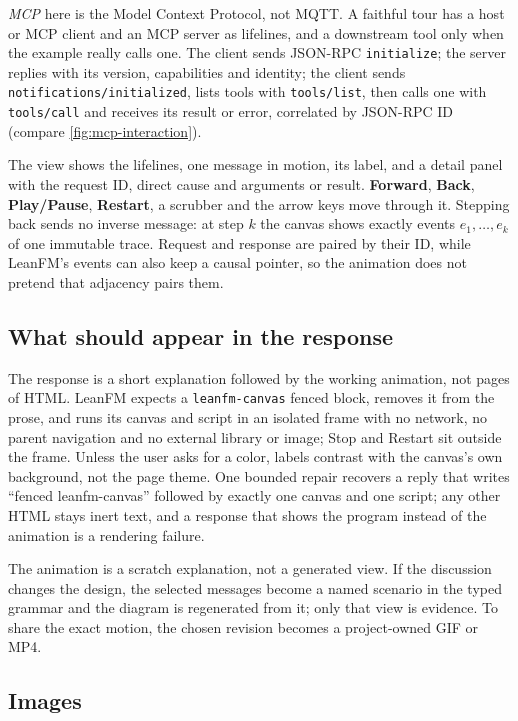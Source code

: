 \emph{MCP} here is the Model Context Protocol, not MQTT. A faithful tour has a
host or MCP client and an MCP server as lifelines, and a downstream tool only
when the example really calls one. The client sends JSON-RPC \texttt{initialize};
the server replies with its version, capabilities and identity; the client sends
\texttt{notifications/initialized}, lists tools with \texttt{tools/list}, then
calls one with \texttt{tools/call} and receives its result or error, correlated
by JSON-RPC ID (compare \cref{fig:mcp-interaction}).

The view shows the lifelines, one message in motion, its label, and a detail
panel with the request ID, direct cause and arguments or result.
\textbf{Forward}, \textbf{Back}, \textbf{Play/Pause}, \textbf{Restart}, a scrubber
and the arrow keys move through it. Stepping back sends no inverse message: at
step $k$ the canvas shows exactly events $e_1,\ldots,e_k$ of one immutable trace.
Request and response are paired by their ID, while LeanFM's events can also keep
a causal pointer, so the animation does not pretend that adjacency pairs them.

\subsection{What should appear in the response}

The response is a short explanation followed by the working animation, not pages
of HTML. LeanFM expects a \texttt{leanfm-canvas} fenced block, removes it from the
prose, and runs its canvas and script in an isolated frame with no network, no
parent navigation and no external library or image; Stop and Restart sit outside
the frame. Unless the user asks for a color, labels contrast with the canvas's own
background, not the page theme. One bounded repair recovers a reply that writes
``fenced leanfm-canvas'' followed by exactly one canvas and one script; any other
HTML stays inert text, and a response that shows the program instead of the
animation is a rendering failure.

The animation is a scratch explanation, not a generated view. If the discussion
changes the design, the selected messages become a named scenario in the typed
grammar and the diagram is regenerated from it; only that view is evidence. To
share the exact motion, the chosen revision becomes a project-owned GIF or MP4.

\subsection{Images}

